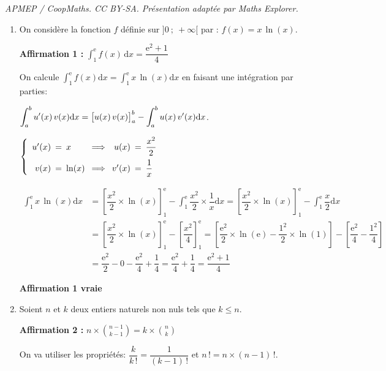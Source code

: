 \documentclass[10pt]{article}
\providecommand{\e}{{\mathrm{e}}}
\renewcommand{\d}{{\mathrm{d}}}
\providecommand{\ds}{\displaystyle}
\begin{document}
\noindent\textit{APMEP / CoopMaths. CC BY-SA. Présentation adaptée par Maths Explorer.}\par\medskip
\begin{enumerate}
		\item On considère la fonction $f$ définie sur $]0 ~;~ +\infty [$ par : $f(x)=x\, \ln(x)$.

		\textbf{Affirmation 1 :}
$\ds\int_{1}^{\e} f(x) \,\mathrm{d} x=\dfrac{\e^{2}+1}{4}$

On calcule $\ds\int_{1}^{\e} f(x) \d x = \ds\int_{1}^{\e} x\,\ln(x) \d x$ en faisant une intégration par parties:

$\ds\int_{a}^{b} u'(x)\,v(x) \d x = \left [u(x)\,v(x)\strut \right ]_{a}^{b}- \int_{a}^{b} u(x) \, v'(x) \d x$.

$\left \{
\begin{array}{r !{=} l !{\implies} r !{=} l}
u'(x) & x & u(x) & \dfrac{x^2}{2}\\[8pt]
v(x) & \ln(x) & v'(x) & \dfrac{1}{x}
\end{array}
\right .$

$\begin{aligned}
 \ds\int_{1}^{\e} x\,\ln(x) \d x 
& = \left [\dfrac{x^2}{2}\times \ln(x) \right ]_{1}^{\e}- \int_{1}^{\e} \dfrac{x^2}{2}\times \dfrac{1}{x} \d x
= \left [\dfrac{x^2}{2}\times \ln(x) \right ]_{1}^{\e}- \int_{1}^{\e} \dfrac{x}{2} \d x\\
& = \left [\dfrac{x^2}{2}\times \ln(x) \right ]_{1}^{\e}-  \left [ \dfrac{x^2}{4}  \right ]_{1}^{\e}
= \left [\dfrac{\e^2}{2}\times \ln(\e) - \dfrac{1^2}{2}\times \ln(1) \right ]-  \left [ \dfrac{\e^2}{4} - \dfrac{1^2}{4} \right ]\\
& = \dfrac{\e^2}{2} - 0 - \dfrac{\e^2}{4} + \dfrac{1}{4}
= \dfrac{\e^2}{4}+\dfrac{1}{4}
= \dfrac{\e^2+1}{4}
\end{aligned}$

\hfill\textbf{Affirmation 1 vraie}

\item Soient $n$ et $k$ deux entiers naturels non nuls tels que $k \leqslant n$.

\textbf{Affirmation 2 :}
$\ds n \times\binom{n-1}{k-1}=k \times\binom{ n}{k}$

On va utiliser les propriétés: $\dfrac{k}{k\,!} = \dfrac{1}{(k-1)\,!}$ et $n\,! = n\times (n-1)\,!$.

\end{enumerate}
\end{document}
